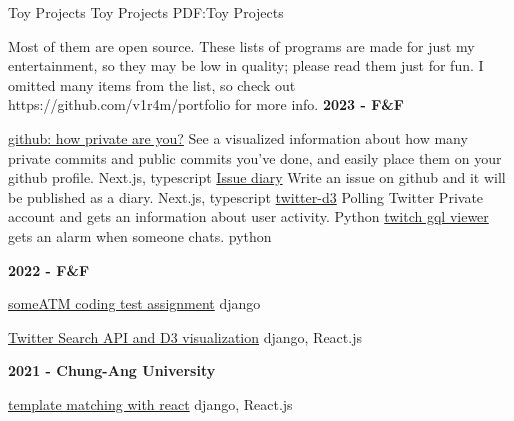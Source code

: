 \documentclass[letterpaper,MMMyyyy,nonstopmode]{simpleresumecv}
\begin{document}
\begin{Body}

\Section
{Toy Projects}
{Toy Projects}
{PDF:Toy Projects}
\begin{Detail}
\Entry
{Most of them are open source. These lists of programs are made for just my entertainment, so they may be low in quality; please read them just for fun. I omitted many items from the list, so check out https://github.com/v1r4m/portfolio for more info.}
\Gap
{\textbf{2023 - F\&F}}

 


\BulletItem
\href{https://github.com/v1r4m/how-private-are-you}
{github: how private are you?}
\SubBulletItem
{See a visualized information about how many private commits and public commits you've done, and easily place them on your github profile. }
\SubBulletItem
{Next.js, typescript}
\hfill
{}
\BigGap
\BulletItem
\href{https://github.com/v1r4m/issue-diary-v1r4m}
{Issue diary}
\SubBulletItem
{Write an issue on github and it will be published as a diary.}
\SubBulletItem
{Next.js, typescript}
\hfill
{}
\BigGap
\BulletItem
\href{https://github.com/v1r4m/twitter-d3}
{twitter-d3}
\SubBulletItem
{Polling Twitter Private account and gets an information about user activity.}
\SubBulletItem
{Python}
\hfill
{}
\BigGap
\BulletItem
\href{https://github.com/v1r4m/twitch_gql_viewer}
{twitch gql viewer}
\SubBulletItem
{gets an alarm when someone chats.}
\SubBulletItem
{python}
\hfill
{}

  
\BigGap
{\textbf{2022 - F\&F}}




\BulletItem
\href{https://github.com/v1r4m/someATM}
{someATM coding test assignment}
\SubBulletItem
{django}
\hfill
{}

\BulletItem
\href{https://github.com/v1r4m/NLP}
{Twitter Search API and D3 visualization}
\SubBulletItem
{django, React.js}
\hfill
{}

  
\BigGap
{\textbf{2021 - Chung-Ang University}}

 

\BulletItem
\href{https://www.youtube.com/watch?v=Hj0yWGxVoQQ}
{template matching with react}
\SubBulletItem
{django, React.js}
\hfill
{}


\end{Detail}
\end{Body}
\end{document}
